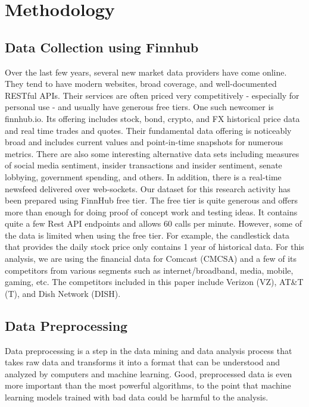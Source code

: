 \documentclass[conference]{IEEEtran}
\begin{document}
\section{Methodology}

\subsection{Data Collection using Finnhub}

Over the last few years, several new market data providers have come online. They tend to have modern websites, broad coverage, and well-documented RESTful APIs.
Their services are often priced very competitively - especially for personal use - and usually have generous free tiers.
One such newcomer is finnhub.io. Its offering includes stock, bond, crypto, and FX historical price data and real time trades and quotes.
Their fundamental data offering is noticeably broad and includes current values and point-in-time snapshots for numerous metrics.
There are also some interesting alternative data sets including measures of social media sentiment, insider transactions and insider sentiment, senate lobbying, government spending, and others.
In addition, there is a real-time newsfeed delivered over web-sockets.
Our dataset for this research activity has been prepared using FinnHub free tier.
The free tier is quite generous and offers more than enough for doing proof of concept work and testing ideas.
It contains quite a few Rest API endpoints and allows 60 calls per minute.
However, some of the data is limited when using the free tier.
For example, the candlestick data that provides the daily stock price only contains 1 year of historical data.
For this analysis, we are using the financial data for Comcast (CMCSA) and a few of its competitors from various segments such as internet/broadband, media, mobile, gaming, etc.
The competitors included in this paper include Verizon (VZ), AT\&T (T), and Dish Network (DISH).

\subsection{Data Preprocessing}
Data preprocessing is a step in the data mining and data analysis process that takes raw data and transforms it into a format that can be understood and analyzed by computers and machine learning.
Good, preprocessed data is even more important than the most powerful algorithms, to the point that machine learning models trained with bad data could be harmful to the analysis.
\end{document}
